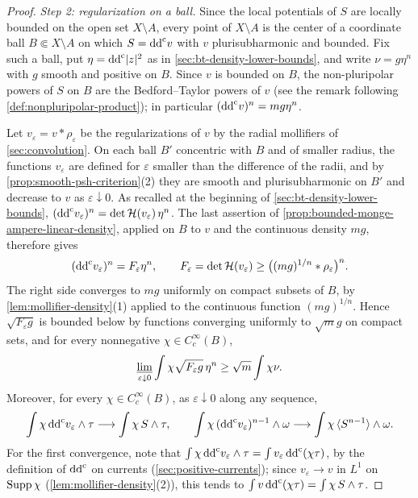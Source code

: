 \begin{proof}
\emph{Step 2: regularization on a ball.} Since the local potentials of $S$ are locally bounded on the open set $X\setminus A$, every point of $X\setminus A$ is the center of a coordinate ball $B\Subset X\setminus A$ on which $S=\mathrm{dd}^{\mathrm{c}} v$ with $v$ plurisubharmonic and bounded. Fix such a ball, put $\eta=\mathrm{dd}^{\mathrm{c}}|z|^2$ as in \cref{sec:bt-density-lower-bounds}, and write $\nu=g\eta^n$ with $g$ smooth and positive on $B$. Since $v$ is bounded on $B$, the non-pluripolar powers of $S$ on $B$ are the Bedford--Taylor powers of $v$ (see the remark following \cref{def:nonpluripolar-product}); in particular $(\mathrm{dd}^{\mathrm{c}} v)^n=mg\eta^n$.

Let $v_\varepsilon=v*\rho_\varepsilon$ be the regularizations of $v$ by the radial mollifiers of \cref{sec:convolution}. On each ball $B'$ concentric with $B$ and of smaller radius, the functions $v_\varepsilon$ are defined for $\varepsilon$ smaller than the difference of the radii, and by \cref{prop:smooth-psh-criterion}(2) they are smooth and plurisubharmonic on $B'$ and decrease to $v$ as $\varepsilon\downarrow0$. As recalled at the beginning of \cref{sec:bt-density-lower-bounds}, $(\mathrm{dd}^{\mathrm{c}} v_\varepsilon)^n=\det\mathcal H(v_\varepsilon)\,\eta^n$. The last assertion of \cref{prop:bounded-monge-ampere-linear-density}, applied on $B$ to $v$ and the continuous density $mg$, therefore gives
\[
 (\mathrm{dd}^{\mathrm{c}} v_\varepsilon)^n=F_\varepsilon\eta^n,
 \qquad
 F_\varepsilon=\det\mathcal H(v_\varepsilon)\geq
       \bigl((mg)^{1/n}*\rho_\varepsilon\bigr)^n.
\]
The right side converges to $mg$ uniformly on compact subsets of $B$, by \cref{lem:mollifier-density}(1) applied to the continuous function $(mg)^{1/n}$. Hence $\sqrt{F_\varepsilon g}$ is bounded below by functions converging uniformly to $\sqrt mg$ on compact sets, and for every nonnegative $\chi\in C^\infty_c(B)$,
\begin{equation}\label{eq:mixed-trace-local-root-limit}
 \varliminf_{\varepsilon\downarrow0}
       \int\chi\sqrt{F_\varepsilon g}\,\eta^n
                  \geq\sqrt m\int\chi\nu.
\end{equation}
Moreover, for every $\chi\in C^\infty_c(B)$, as $\varepsilon\downarrow0$ along any sequence,
\[
 \int\chi\,\mathrm{dd}^{\mathrm{c}} v_\varepsilon\wedge\tau\longrightarrow\int\chi\,S\wedge\tau,
 \qquad
 \int\chi\,(\mathrm{dd}^{\mathrm{c}} v_\varepsilon)^{n-1}\wedge\omega\longrightarrow\int\chi\,\langle S^{n-1}\rangle\wedge\omega.
\]
For the first convergence, note that $\int\chi\,\mathrm{dd}^{\mathrm{c}} v_\varepsilon\wedge\tau=\int v_\varepsilon\,\mathrm{dd}^{\mathrm{c}}(\chi\tau)$, by the definition of $\mathrm{dd}^{\mathrm{c}}$ on currents (\cref{sec:positive-currents}); since $v_\varepsilon\to v$ in $L^1$ on $\operatorname{Supp}\chi$ (\cref{lem:mollifier-density}(2)), this tends to $\int v\,\mathrm{dd}^{\mathrm{c}}(\chi\tau)=\int\chi\,S\wedge\tau$.


\end{proof}
